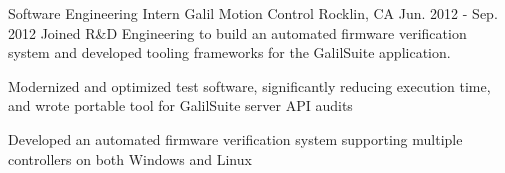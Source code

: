\begin{cventries}
\cventry
    {Software Engineering Intern} %
    {Galil Motion Control} %
    {Rocklin, CA} %
    {Jun. 2012 - Sep. 2012} %
    {Joined R\&D Engineering to build an automated firmware verification system and developed tooling frameworks for the GalilSuite application.} %
    {
      \begin{cvitems} %
        \item {Modernized and optimized test software, significantly reducing execution time, and wrote portable tool for GalilSuite server API audits}
        \item {Developed an automated firmware verification system supporting multiple controllers on both Windows and Linux} 
      \end{cvitems}
    }

\end{cventries}
